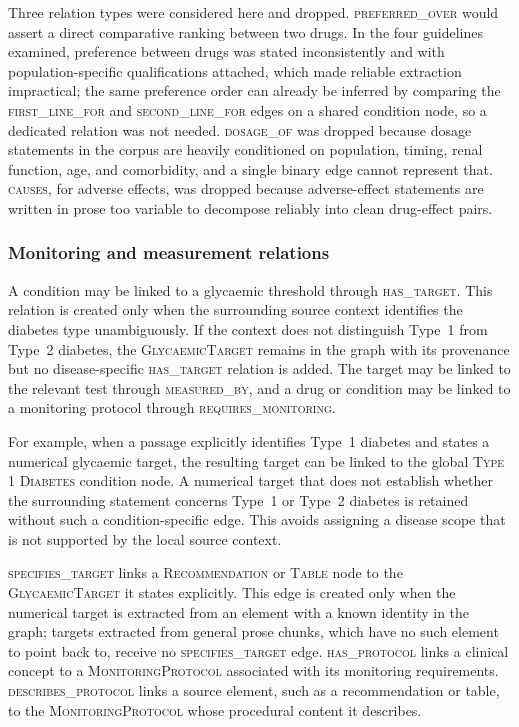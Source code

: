 Three relation types were considered here and dropped. \textsc{preferred\_over} would assert a direct comparative ranking between two drugs. In the four guidelines examined, preference between drugs was stated inconsistently and with population-specific qualifications attached, which made reliable extraction impractical; the same preference order can already be inferred by comparing the \textsc{first\_line\_for} and \textsc{second\_line\_for} edges on a shared condition node, so a dedicated relation was not needed. \textsc{dosage\_of} was dropped because dosage statements in the corpus are heavily conditioned on population, timing, renal function, age, and comorbidity, and a single binary edge cannot represent that. \textsc{causes}, for adverse effects, was dropped because adverse-effect statements are written in prose too variable to decompose reliably into clean drug-effect pairs.

\subsubsection{Monitoring and measurement relations}
A condition may be linked to a glycaemic threshold through
\textsc{has\_target}. This relation is created only when the surrounding
source context identifies the diabetes type unambiguously. If the context
does not distinguish Type~1 from Type~2 diabetes, the
\textsc{GlycaemicTarget} remains in the graph with its provenance but no
disease-specific \textsc{has\_target} relation is added. The target may
be linked to the relevant test through \textsc{measured\_by}, and a drug or condition may be linked to a monitoring protocol through
\textsc{requires\_monitoring}.

For example, when a passage explicitly identifies Type~1 diabetes and
states a numerical glycaemic target, the resulting target can be linked
to the global \textsc{Type 1 Diabetes} condition node. A numerical target
that does not establish whether the surrounding statement concerns
Type~1 or Type~2 diabetes is retained without such a condition-specific
edge. This avoids assigning a disease scope that is not supported by the
local source context.

\textsc{specifies\_target} links a \textsc{Recommendation} or \textsc{Table} node to the \textsc{GlycaemicTarget} it states explicitly. This edge is created only when the numerical target is extracted from an element with a known identity in the graph; targets extracted from general prose chunks, which have no such element to point back to, receive no \textsc{specifies\_target} edge. \textsc{has\_protocol} links a clinical concept to a
\textsc{MonitoringProtocol} associated with its monitoring requirements.
\textsc{describes\_protocol} links a source element, such as a
recommendation or table, to the \textsc{MonitoringProtocol} whose
procedural content it describes.

